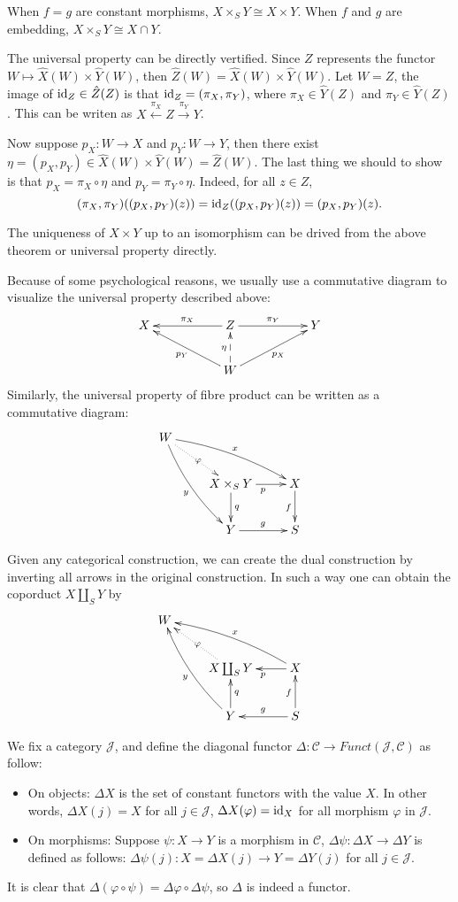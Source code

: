 \documentclass[9pt]{extarticle}
\newcommand{\cc}{\mathcal{C}}
\begin{document}
When $f=g$ are constant morphisms, $X\times_S Y\cong X\times Y$. When $f$ and $g$ are embedding, $X\times_S Y\cong X\cap Y$.

The universal property can be directly vertified. Since $Z$ represents the functor $W\mapsto \hat{X}(W)\times\hat{Y}(W)$, then $\hat{Z}(W)=\hat{X}(W)\times\hat{Y}(W)$. Let $W=Z$, the image of $\operatorname{id}_Z\in \hat{Z}(Z)$ is that $\operatorname{id}_Z=(\pi_X,\pi_Y)$, where $\pi_X\in \hat{Y}(Z)$ and $\pi_Y\in \hat{Y}(Z)$. This can be writen as
$X\xleftarrow{\pi_X} Z \xrightarrow{\pi_Y}Y$.

Now suppose $p_X:W\to X$ and $p_Y:W\to Y$, then there exist $\eta=(p_X,p_Y)\in \hat{X}(W)\times\hat{Y}(W)= \hat{Z}(W)$. The last thing we should to show is that $p_X=\pi_X\circ \eta$ and $p_Y=\pi_Y\circ \eta$. Indeed, for all $z\in Z$,
\[
	(\pi_X,\pi_Y)((p_X,p_Y)(z))=\operatorname{id}_Z((p_X,p_Y)(z))=(p_X,p_Y)(z).
\]

The uniqueness of $X\times Y$ up to an isomorphism can be drived from the above theorem or universal property directly. 

Because of some psychological reasons, we usually use a commutative diagram to visualize the universal property described above:
\[
\begin{xy}
	\xymatrix
	{
		X &&\ar[ll]_{\pi_X}Z\ar[rr]^{\pi_Y}&&Y \\
		&&\ar[urr]_{p_X}W\ar@{-->}[u]^{\eta}\ar[ull]^{p_Y}&&
	}
\end{xy}
\]
Similarly, the universal property of fibre product can be written as a commutative diagram:
\[
\begin{xy}
	\xymatrix{
		W \ar@/_/[ddr]_y \ar@{.>}[dr]|{\varphi} \ar@/^/[drr]^x \\  
	 	& X \times_S Y \ar[d]^q \ar[r]_p & X \ar[d]_f \\
	 	& Y \ar[r]^g & S
	}
\end{xy}
\]

Given any categorical construction, we can create the dual construction by inverting all arrows in the original construction. In such a way one can obtain the coporduct $X\coprod_S Y$ by
\[
\begin{xy}
	\xymatrix{
		W\\  
	 	& X \coprod_S Y \ar@{.>}[lu]|{\varphi} & X \ar[l]^p\ar@/_/[ull]_x  \\
	 	& Y \ar@/^/[uul]^y  \ar[u]_q& S\ar[u]^f\ar[l]_g
	}
\end{xy}
\]

We fix a category $\mathcal{J}$, and define the diagonal functor $\Delta:\cc\to \textit{Funct}(\mathcal{J},\cc)$ as follow:
\begin{itemize}
\item On objects: $\Delta X$ is the set of constant functors with the value $X$. In other words, $\Delta X(j)=X$ for all $j\in\mathcal{J}$, $\Delta X(\varphi)=\operatorname{id}_X$ for all morphism $\varphi$ in $\mathcal{J}$.
\item On morphisms: Suppose $\psi:X\to Y$ is a morphism in $\cc$, $\Delta\psi:\Delta X\to \Delta Y$ is defined as follows: $\Delta\psi(j):X=\Delta X(j)\to Y=\Delta Y(j)$ for all $j\in \mathcal{J}$.
\end{itemize}
It is clear that $\Delta(\varphi\circ\psi)=\Delta\varphi\circ\Delta\psi$, so $\Delta$ is indeed a functor.
\end{document}
